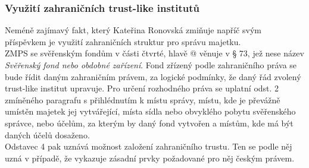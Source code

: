 \documentclass{article}
\makeatletter
\newcommand*{\rom}[1]{\expandafter\@slowromancap\romannumeral #1@}
\makeatother
\begin{document}

\newpage

\subsubsection{Využití zahraničních trust-like institutů}

Neméně zajímavý fakt, který Kateřina Ronovská zmiňuje napříč svým příspěvkem je využití zahraničních struktur pro správu majetku.\\

ZMPS se svěřenským fondům v části čtvrté, hlavě \rom{7} věnuje v § 73, jež nese název \textit{Svěřenský fond nebo obdobné zařízení}. Fond zřízený podle zahraničního práva se bude řídit daným zahraničním právem, za logické podmínky, že daný řád zvolený trust-like institut upravuje. Pro určení rozhodného práva se uplatní odst. 2 zmíněného paragrafu s přihlédnutím k místu správy, místu, kde je převážně umístěn majetek jej vytvářející, místa sídla nebo obvyklého pobytu svěřenského správce, nebo účelům, za kterým by daný fond vytvořen a místům, kde má být daných účelů dosaženo.\\

Odstavec 4 pak uznává možnost založení zahraničního trustu. Ten se podle něj uzná v případě, že vykazuje zásadní prvky požadované pro něj českým právem.\\
\end{document}
